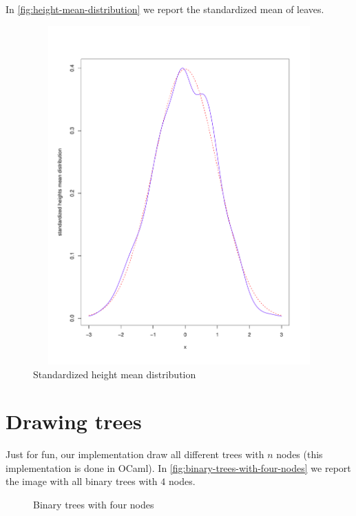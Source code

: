 In \autoref{fig:height-mean-distribution} we report the standardized
mean of leaves.
\begin{figure}[htb]
  \centering
  \includegraphics[height=13cm,
  width=13cm]{pictures/repeated-sampling-height-mean.pdf}
  \caption{Standardized height mean distribution}
  \label{fig:height-mean-distribution}
\end{figure}

\section{Drawing trees}

Just for fun, our implementation draw all different trees with $n$
nodes (this implementation is done in OCaml). In
\autoref{fig:binary-trees-with-four-nodes} we report the image with
all binary trees with $4$ nodes.
\begin{figure}[htb]
  \centering
  \caption{Binary trees with four nodes}
  \label{fig:binary-trees-with-four-nodes}
\end{figure}
